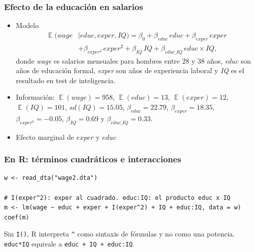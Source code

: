 \documentclass[t, compress, spanish, aspectratio=169]{beamer}
\DeclareMathOperator{\E}{\mathbb{E}}
\begin{document}
    
    \begin{frame}
        \frametitle{Efecto de la educaci\'on en salarios}
        \begin{itemize}
            \item  Modelo
            \begin{align*}
            		\E(wage&|educ, exper, IQ) = \beta_0 +\beta_{educ} \,educ +\beta_{exper}\, exper \\
           		 & +\beta_{exper^2} \,exper^2 + \beta_{IQ} \,IQ + \beta_{educ\_IQ} \,educ \times IQ ,
            \end{align*}
            donde \emph{wage} es salarios mensuales para hombres entre 28 y 38 a\~nos, \emph{educ} son a\~nos de educaci\'on formal, \emph{exper} son a\~nos de experiencia laboral y \emph{IQ} es el resultado en test de inteligencia.
            \item Informaci\'on: $\E(wage)=958$, $\E(educ)=13$, $\E(exper)=12$, $\E(IQ)=101$, $sd(IQ)=15.05$, $\beta_{educ}=22.79$, $\beta_{exper}=18.35$, $\beta_{exper^{2}}=-0.05$, $\beta_{IQ}=0.69$ y $\beta_{educ\_IQ}=0.33$.
            \item Efecto marginal de $exper$ y $educ$
        \end{itemize}
    \end{frame}
\begin{frame}[fragile]
	\frametitle{En R: t\'erminos cuadr\'aticos e interacciones}
\footnotesize
\begin{verbatim}
w <- read_dta("wage2.dta")

# I(exper^2): exper al cuadrado. educ:IQ: el producto educ x IQ
m <- lm(wage ~ educ + exper + I(exper^2) + IQ + educ:IQ, data = w)
coef(m)
\end{verbatim}
\small
Sin \texttt{I()}, R interpreta \texttt{\textasciicircum} como sintaxis de f\'ormulas y no como una potencia. \texttt{educ*IQ} equivale a \texttt{educ + IQ + educ:IQ}.
\end{frame}
    
\end{document}
